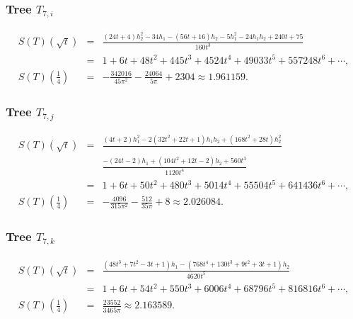 \documentclass[12pt]{amsart}
\theoremstyle{plain}
\theoremstyle{remark}
\begin{document}
\subsubsection{Tree $T_{7,i}$}
\begin{eqnarray*}
S(T)(\sqrt{t}) 
& = & 
\frac{\left(24 t +4\right) h_2^{2}  - 34 h_1 -  \left(56 t +16\right) h_2 - 5 h_1^{2} - 24 h_1 h_2 + 240 t + 75}{160 t^{3}}
\\
& = & 
1+6 t +48 t^{2}+445 t^{3}+4524 t^{4}+49033 t^{5}+557248 t^{6}+\cdots, \\
S(T)\left( \frac14\right)
& = & 
-\frac{342016}{45 \pi^{2}}
-\frac{24064}{5 \pi}
+2304
\approx 1.961159
 .
\end{eqnarray*}

\subsubsection{Tree $T_{7,j}$}
\begin{eqnarray*}
S(T)(\sqrt{t}) 
& = & 
\frac{  
 \left(4 t +2\right) h_1^{2} 
 -2 \left(32 t^{2}+22 t +1\right)  h_1 h_2 +  \left(168 t^{2}+28 t \right) h_2^{2}
 }{}\\
&  & 
\frac{- \left(24 t -2\right) h_1 + \left(104 t^{2}+12 t -2\right) h_2 + 560 t^{3}}{1120 t^{4}}\\
& = & 
1+6 t +50 t^{2}+480 t^{3}+5014 t^{4}+55504 t^{5}+641436 t^{6}+\cdots, \\
S(T)\left( \frac14\right)
& = & 
-\frac{4096}{315 \pi^{2}}
-\frac{512}{35 \pi}
+8
\approx 2.026084
 .
\end{eqnarray*}

\subsubsection{Tree $T_{7,k}$}\label{sec:star_s=6}
\begin{eqnarray*}
S(T)(\sqrt{t}) 
& = & 
\frac{  \left(48 t^{3}+7 t^{2}-3 t +1\right) h_1 -  \left(768 t^{4}+130 t^{3}+9 t^{2}+3 t +1\right) h_2}{4620 t^{5}}
\\
& = & 
1+6 t +54 t^{2}+550 t^{3}+6006 t^{4}+68796 t^{5}+816816 t^{6}+\cdots, \\
S(T)\left( \frac14\right)
& = & 
\frac{23552}{3465 \pi} 
\approx 2.163589
 .
\end{eqnarray*}
\end{document}
